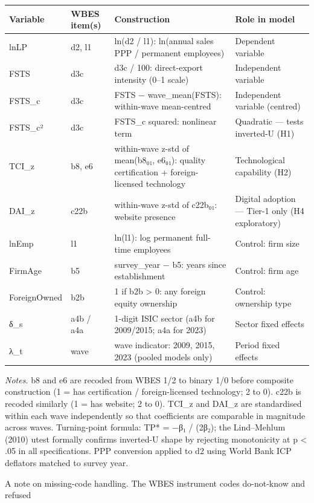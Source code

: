 \documentclass[12pt,a4paper]{article}
\begin{document}
\begin{longtable}[]{@{}llll@{}}
\toprule\noalign{}
Variable & WBES item(s) & Construction & Role in model \\
\midrule\noalign{}
\endhead
\bottomrule\noalign{}
\endlastfoot
lnLP & d2, l1 & ln(d2 / l1): ln(annual sales PPP / permanent employees)
& Dependent variable \\
FSTS & d3c & d3c / 100: direct-export intensity (0--1 scale) &
Independent variable \\
FSTS\_c & d3c & FSTS − wave\_mean(FSTS): within-wave mean-centred &
Independent variable (centred) \\
FSTS\_c² & d3c & FSTS\_c squared: nonlinear term & Quadratic --- tests
inverted-U (H1) \\
TCI\_z & b8, e6 & within-wave z-std of mean(b8₀₁, e6₀₁): quality
certification + foreign-licensed technology & Technological capability
(H2) \\
DAI\_z & c22b & within-wave z-std of c22b₀₁: website presence & Digital
adoption --- Tier-1 only (H4 exploratory) \\
lnEmp & l1 & ln(l1): log permanent full-time employees & Control: firm
size \\
FirmAge & b5 & survey\_year − b5: years since establishment & Control:
firm age \\
ForeignOwned & b2b & 1 if b2b \textgreater{} 0: any foreign equity
ownership & Control: ownership type \\
δ\_s & a4b / a4a & 1-digit ISIC sector (a4b for 2009/2015; a4a for 2023)
& Sector fixed effects \\
λ\_t & wave & wave indicator: 2009, 2015, 2023 (pooled models only) &
Period fixed effects \\
\end{longtable}

\emph{Notes.} b8 and e6 are recoded from WBES 1/2 to binary 1/0 before
composite construction (1 = has certification / foreign-licensed
technology; 2 to 0). c22b is recoded similarly (1 = has website; 2 to
0). TCI\_z and DAI\_z are standardised within each wave independently so
that coefficients are comparable in magnitude across waves.
Turning-point formula: TP* = −β₁ / (2β₂); the Lind--Mehlum (2010) utest
formally confirms inverted-U shape by rejecting monotonicity at p
\textless{} .05 in all specifications. PPP conversion applied to d2
using World Bank ICP deflators matched to survey year.

A note on missing-code handling. The WBES instrument codes do-not-know
and refused
\end{document}
